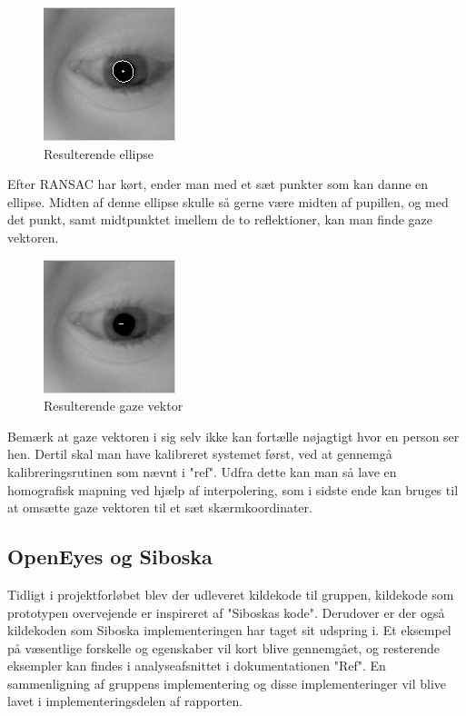 \documentclass[a4paper,oneside,12pt]{article}
\begin{document}
	\begin{figure}
	\centering
	\includegraphics[width=0.4\linewidth]{Billeder/Starburst,Ellipse.png}
	\caption{Resulterende ellipse}
	\label{fig:Starburst,Ellipse}
	\end{figure}
	
	Efter RANSAC har kørt, ender man med et sæt punkter som kan danne en ellipse. Midten af denne ellipse skulle så gerne være midten af pupillen, og med det punkt, samt midtpunktet imellem de to reflektioner, kan man finde gaze  vektoren.
	
	\begin{figure}
	\centering
	\includegraphics[width=0.4\linewidth]{Billeder/Starburst,Gaze.png}
	\caption{Resulterende gaze vektor}
	\label{fig:Starburst,Gaze}
	\end{figure}
	
	Bemærk at gaze vektoren i sig selv ikke kan fortælle nøjagtigt hvor en person ser hen. Dertil skal man have kalibreret systemet først, ved at gennemgå kalibreringsrutinen som nævnt i "ref". Udfra dette kan man så lave en homografisk mapning ved hjælp af interpolering, som i sidste ende kan bruges til at omsætte gaze vektoren til et sæt skærmkoordinater.
	
	\subsection{OpenEyes og Siboska}
	Tidligt i projektforløbet blev der udleveret kildekode til gruppen, kildekode som prototypen overvejende er inspireret af "Siboskas kode". Derudover er der også kildekoden som Siboska implementeringen har taget sit udspring i. Et eksempel på væsentlige forskelle og egenskaber vil kort blive gennemgået, og resterende eksempler kan findes i analyseafsnittet i dokumentationen "Ref". En sammenligning af gruppens implementering og disse implementeringer vil blive lavet i implementeringsdelen af rapporten.
	
\end{document}
